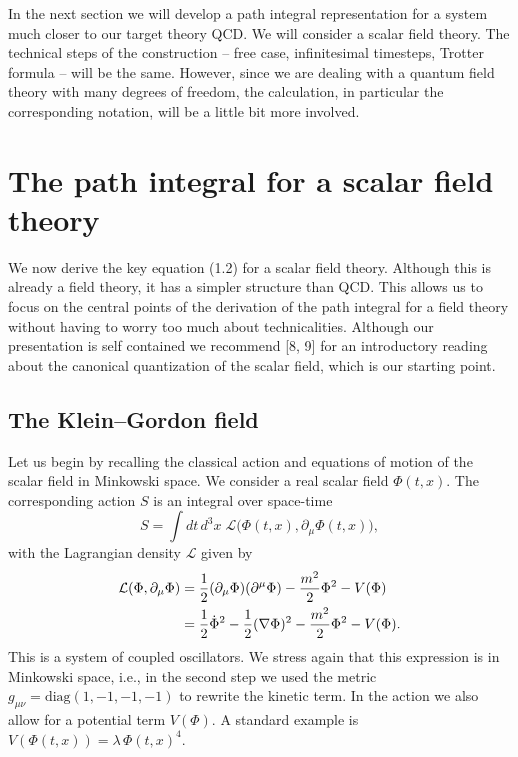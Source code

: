 In the next section we will develop a path integral representation for a system
much closer to our target theory QCD. We will consider a scalar field theory.
The technical steps of the construction -- free case, infinitesimal timesteps,
Trotter formula -- will be the same. However, since we are dealing with a
quantum field theory with many degrees of freedom, the calculation, in
particular the corresponding notation, will be a little bit more involved.

\section{The path integral for a scalar field theory}

We now derive the key equation (1.2) for a scalar field theory. Although this
is already a field theory, it has a simpler structure than QCD. This allows us
to focus on the central points of the derivation of the path integral for a
field theory without having to worry too much about technicalities. Although
our presentation is self contained we recommend [8, 9] for an introductory
reading about the canonical quantization of the scalar field, which is our
starting point.

\subsection{The Klein--Gordon field}

Let us begin by recalling the classical action and equations of motion of the
scalar field in Minkowski space. We consider a real scalar field
$\Phi(t,x)$. The corresponding action $S$ is an integral over space-time
\begin{equation}
  S = \int dt\,d^3x\;\mathcal{L}\big(\Phi(t,x), \partial_\mu\Phi(t,x)\big),
\end{equation}
with the Lagrangian density $\mathcal{L}$ given by
\begin{align}
  \mathcal{L}(\Phi, \partial_\mu\Phi)
  &= \frac{1}{2}(\partial_\mu\Phi)(\partial^\mu\Phi) - \frac{m^2}{2}\Phi^2 - V(\Phi) \notag\\
  &= \frac{1}{2}\dot{\Phi}^2 - \frac{1}{2}(\nabla\Phi)^2 - \frac{m^2}{2}\Phi^2 - V(\Phi).
\end{align}
This is a system of coupled oscillators. We stress again that this expression
is in Minkowski space, i.e., in the second step we used the metric
$g_{\mu\nu} = \mathrm{diag}(1,-1,-1,-1)$ to rewrite the kinetic term. In the action we
also allow for a potential term $V(\Phi)$. A standard example is
$V(\Phi(t,x)) = \lambda\,\Phi(t,x)^4$.

